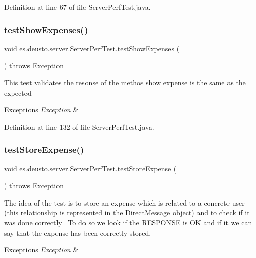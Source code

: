 Definition at line 67 of file Server\+Perf\+Test.\+java.

\mbox{\label{classes_1_1deusto_1_1server_1_1_server_perf_test_a823b0fc7575feded84e73dc929a32399}} 
\subsubsection{\texorpdfstring{test\+Show\+Expenses()}{testShowExpenses()}}
{\footnotesize\ttfamily void es.\+deusto.\+server.\+Server\+Perf\+Test.\+test\+Show\+Expenses (\begin{DoxyParamCaption}{ }\end{DoxyParamCaption}) throws Exception}

This test validates the resonse of the methos show expense is the same as the expected 
\begin{DoxyExceptions}{Exceptions}
{\em Exception} & \\
\hline
\end{DoxyExceptions}


Definition at line 132 of file Server\+Perf\+Test.\+java.

\mbox{\label{classes_1_1deusto_1_1server_1_1_server_perf_test_a1d4685eb157c172ece9a6ef9ba302696}} 
\subsubsection{\texorpdfstring{test\+Store\+Expense()}{testStoreExpense()}}
{\footnotesize\ttfamily void es.\+deusto.\+server.\+Server\+Perf\+Test.\+test\+Store\+Expense (\begin{DoxyParamCaption}{ }\end{DoxyParamCaption}) throws Exception}

The idea of the test is to store an expense which is related to a concrete user (this relationship is represented in the Direct\+Message object) and to check if it was done correctly~\newline
To do so we look if the R\+E\+S\+P\+O\+N\+SE is OK and if it we can say that the expense has been correctly stored. 
\begin{DoxyExceptions}{Exceptions}
{\em Exception} & \\
\hline
\end{DoxyExceptions}


